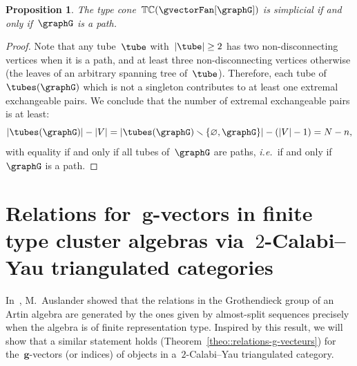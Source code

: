 \documentclass{amsart}
\newtheorem{proposition}[theorem]{Proposition}
\theoremstyle{definition}
\renewcommand{\b}[1]{{\boldsymbol{#1}}} %
\newcommand{\ssm}{\smallsetminus} %
\newcommand{\ie}{\textit{i.e.}~} %
\newcommand{\typeCone}{\mathbb{TC}} %
\begin{document}
\begin{proposition}
The type cone~$\typeCone(\gvectorFan[\graphG])$ is simplicial if and only if~$\graphG$ is a path.
\end{proposition}

\begin{proof}
Note that any tube~$\tube$ with~$|\tube| \ge 2$ has two non-disconnecting vertices when it is a path, and at least three non-disconnecting vertices otherwise (the leaves of an arbitrary spanning tree of~$\tube$).
Therefore, each tube of~$\tubes(\graphG)$ which is not a singleton contributes to at least one extremal exchangeable pairs.
We conclude that the number of extremal exchangeable pairs is at least:
\[
|\tubes(\graphG)| - |V| = |\tubes(\graphG) \ssm \{\varnothing, \graphG\}| - (|V|-1) = N - n,
\]
with equality if and only if all tubes of~$\graphG$ are paths, \ie if and only if~$\graphG$ is a path.
\end{proof}



\section{Relations for~$\b{g}$-vectors in finite type cluster algebras via~$2$-Calabi--Yau triangulated categories}

In~\cite{Auslander1984}, M.~Auslander showed that the relations in the Grothendieck group of an Artin algebra are generated by the ones given by almost-split sequences precisely when the algebra is of finite representation type.  Inspired by this result, we will show that a similar statement holds (Theorem~\ref{theo::relations-g-vecteurs}) for the~$\b g$-vectors (or indices) of objects in a~$2$-Calabi--Yau triangulated category. 
\end{document}
